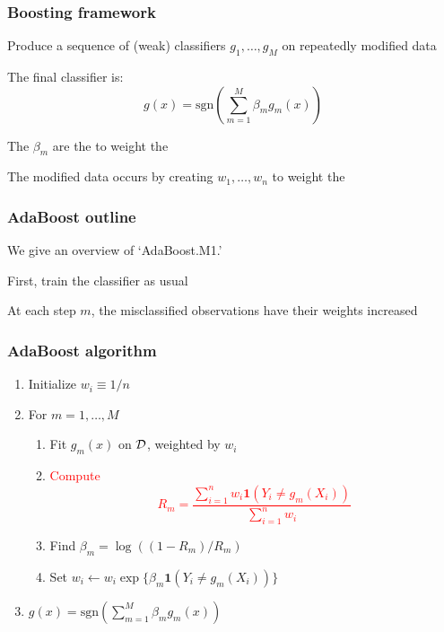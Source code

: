 \documentclass[12pt]{beamer}
\begin{document}
\begin{frame}[fragile]
\frametitle{Boosting framework}
 Produce a sequence of (weak) classifiers $g_1,\ldots,g_M$  on repeatedly modified data

\vsp
The final classifier is:
\[
g(x) = \textrm{sgn}\left(\sum_{m=1}^M \beta_m g_m(x)\right)
\]

\vsp
The $\beta_m$ are the  to weight the 

\vsp
The modified data occurs by creating  $w_1,\ldots,w_n$ to weight the 


\end{frame}

\begin{frame}[fragile]
\frametitle{AdaBoost outline}
We give an overview of `AdaBoost.M1.' 


\vsp
First, train the classifier as usual


\vsp
At each step $m$, the misclassified observations have their weights increased

\end{frame}

\begin{frame}[fragile]
\frametitle{AdaBoost algorithm}
\begin{enumerate}
\item Initialize $w_i \equiv 1/n$
\item For $m = 1,\ldots,M$
\begin{enumerate}
\item Fit $g_m(x)$ on $\mathcal{D}$, weighted by $w_i$
\item \textcolor<2>{red}{Compute
\[
R_m = \frac{\sum_{i=1}^n w_i \mathbf{1}(Y_i \neq g_m(X_i))}{\sum_{i=1}^n w_i}
\]
}
\item Find $\beta_m = \log((1-R_m)/R_m)$
\item Set $w_i \leftarrow w_i\exp\{\beta_m \mathbf{1}(Y_i \neq g_m(X_i))\}$
\end{enumerate}
\item {} $g(x) = \textrm{sgn}\left(\sum_{m=1}^M \beta_m g_m(x)\right)$
\end{enumerate}
\end{frame}
\end{document}
